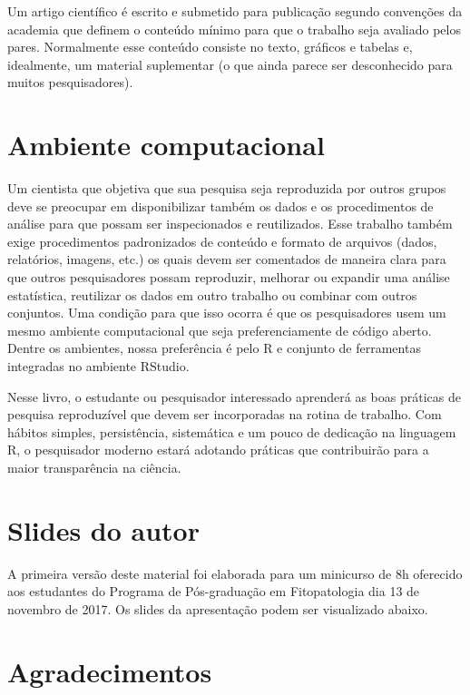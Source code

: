 \documentclass[]{book}
\begin{document}
Um artigo científico é escrito e submetido para publicação segundo
convenções da academia que definem o conteúdo mínimo para que o trabalho
seja avaliado pelos pares. Normalmente esse conteúdo consiste no texto,
gráficos e tabelas e, idealmente, um material suplementar (o que ainda
parece ser desconhecido para muitos pesquisadores).

\hypertarget{ambiente-computacional}{%
\section*{Ambiente computacional}\label{ambiente-computacional}}

Um cientista que objetiva que sua pesquisa seja reproduzida por outros
grupos deve se preocupar em disponibilizar também os dados e os
procedimentos de análise para que possam ser inspecionados e
reutilizados. Esse trabalho também exige procedimentos padronizados de
conteúdo e formato de arquivos (dados, relatórios, imagens, etc.) os
quais devem ser comentados de maneira clara para que outros
pesquisadores possam reproduzir, melhorar ou expandir uma análise
estatística, reutilizar os dados em outro trabalho ou combinar com
outros conjuntos. Uma condição para que isso ocorra é que os
pesquisadores usem um mesmo ambiente computacional que seja
preferenciamente de código aberto. Dentre os ambientes, nossa
preferência é pelo R e conjunto de ferramentas integradas no ambiente
RStudio.

Nesse livro, o estudante ou pesquisador interessado aprenderá as boas
práticas de pesquisa reproduzível que devem ser incorporadas na rotina
de trabalho. Com hábitos simples, persistência, sistemática e um pouco
de dedicação na linguagem R, o pesquisador moderno estará adotando
práticas que contribuirão para a maior transparência na ciência.

\hypertarget{slides-do-autor}{%
\section*{Slides do autor}\label{slides-do-autor}}

A primeira versão deste material foi elaborada para um minicurso de 8h
oferecido aos estudantes do Programa de Pós-graduação em Fitopatologia
dia 13 de novembro de 2017. Os slides da apresentação podem ser
visualizado abaixo.

\hypertarget{agradecimentos}{%
\section*{Agradecimentos}\label{agradecimentos}}
\end{document}
